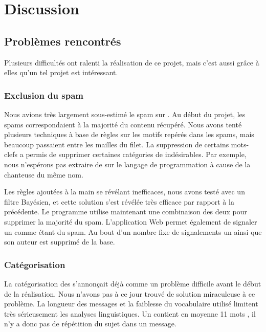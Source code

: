 
\section{Discussion}

\subsection{Problèmes rencontrés}

Plusieurs difficultés ont ralenti la réalisation de ce projet, mais c’est aussi
grâce à elles qu’un tel projet est intéressant.

\subsubsection{Exclusion du spam}

Nous avions très largement sous-estimé le spam sur \twt{}. Au début du projet,
les spams correspondaient à la majorité du contenu récupéré. Nous avons tenté
plusieurs techniques à base de règles sur les motifs repérés dans les spams,
mais beaucoup passaient entre les mailles du filet. La suppression de certains
mots-clefs a permis de supprimer certaines catégories de \tweets{}
indésirables. Par exemple, nous n’espérons pas extraire de \tweets{} sur le
langage de programmation  à cause de la chanteuse du même nom.

Les règles ajoutées à la main se révélant inefficaces, nous avons testé avec un
filtre Bayésien, et cette solution s’est révélée très efficace par rapport à la
précédente. Le programme utilise maintenant une combinaison des deux pour
supprimer la majorité du spam. L’application Web permet également de signaler
un \tweet{} comme étant du spam. Au bout d’un nombre fixe de signalements un
\tweet{} ainsi que son auteur est supprimé de la base.

\subsubsection{Catégorisation}

La catégorisation des \tweets{} s’annonçait déjà comme un problème difficile
avant le début de la réalisation. Nous n’avons pas à ce jour trouvé de solution
miraculeuse à ce problème. La longueur des messages et la faiblesse du
vocabulaire utilisé limitent très sérieusement les analyses linguistiques. Un
\tweet{} contient en moyenne 11 mots \citep{OConnor2010}, il n’y a donc pas de
répétition du sujet dans un message.

